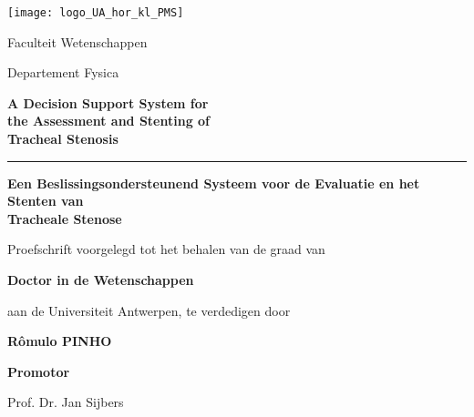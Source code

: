 \thispagestyle{empty}

%
%
%

%


\begin{center}

\texttt{[image: logo\_UA\_hor\_kl\_PMS]}


Faculteit Wetenschappen

Departement Fysica

\vspace{0.7cm}


\LARGE

\textbf{A Decision Support System for\\the Assessment and Stenting of\\Tracheal Stenosis}


\rule{5cm}{0.5pt}

\vspace{0.3cm}

\textbf{Een Beslissingsondersteunend Systeem voor de Evaluatie en het Stenten van\\Tracheale Stenose}

\normalsize

\vspace{1.5cm}

Proefschrift voorgelegd tot het behalen van de graad van

\vspace{0.5cm}

\textbf{Doctor in de Wetenschappen}

\vspace{0.5cm}

aan de Universiteit Antwerpen, te verdedigen door

\vspace{0.5cm}

\textbf{R\^omulo PINHO}
\end{center}

\vspace{1cm}

\textbf{Promotor}

Prof. Dr. Jan Sijbers

\vspace{0.2cm}


